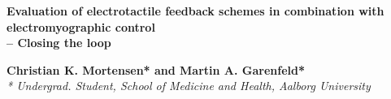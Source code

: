 
%

\begin{center}	
	{\huge\textbf{Evaluation of electrotactile feedback schemes in combination with electromyographic control \\– Closing the loop}}
	
	
	{\large \textbf{Christian K. Mortensen* and Martin A. Garenfeld*}} \\
{\small \textit{* Undergrad. Student, School of Medicine and Health, Aalborg University}}
\end{center}


